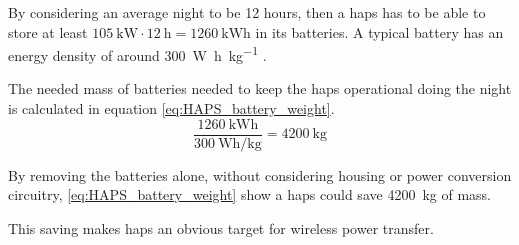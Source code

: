 By considering an average night to be 12 hours, then a \gls{haps} has to be able to store at least $\SI{105}{\kilo\watt} \cdot \SI{12}{\hour} = \SI{1260}{\kilo\watt\hour}$ in its batteries. A typical battery has an energy density of around \SI{300}{\watt\hour\per\kilogram} \citep{report:IEA_batteries}.

The needed mass of batteries needed to keep the \gls{haps} operational doing the night is calculated in equation \ref{eq:HAPS_battery_weight}. 
\begin{equation} \label{eq:HAPS_battery_weight}
	\frac{\SI{1260}{\kilo\watt\hour}}{\SI{300}{\watt\hour\per\kilogram}} = \SI{4200}{\kilogram}
\end{equation}

By removing the batteries alone, without considering housing or power conversion circuitry, \autoref{eq:HAPS_battery_weight} show a \gls{haps} could save \SI{4200}{\kilogram} of mass.

This saving makes \gls{haps} an obvious target for wireless power transfer.